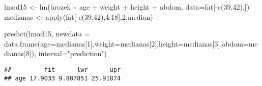 \documentclass[
]{article}
\newenvironment{Shaded}{\begin{snugshade}}{\end{snugshade}}
\newcommand{\AttributeTok}[1]{\textcolor[rgb]{0.77,0.63,0.00}{#1}}
\newcommand{\DecValTok}[1]{\textcolor[rgb]{0.00,0.00,0.81}{#1}}
\newcommand{\FunctionTok}[1]{\textcolor[rgb]{0.00,0.00,0.00}{#1}}
\newcommand{\NormalTok}[1]{#1}
\newcommand{\OtherTok}[1]{\textcolor[rgb]{0.56,0.35,0.01}{#1}}
\newcommand{\SpecialCharTok}[1]{\textcolor[rgb]{0.00,0.00,0.00}{#1}}
\newcommand{\StringTok}[1]{\textcolor[rgb]{0.31,0.60,0.02}{#1}}
\begin{document}
\begin{Shaded}
\begin{Highlighting}[]
\NormalTok{lmod15 }\OtherTok{\textless{}{-}} \FunctionTok{lm}\NormalTok{(brozek }\SpecialCharTok{\textasciitilde{}}\NormalTok{ age }\SpecialCharTok{+}\NormalTok{ weight }\SpecialCharTok{+}\NormalTok{ height }\SpecialCharTok{+}\NormalTok{ abdom, }\AttributeTok{data=}\NormalTok{fat[}\SpecialCharTok{{-}}\FunctionTok{c}\NormalTok{(}\DecValTok{39}\NormalTok{,}\DecValTok{42}\NormalTok{),])}
\NormalTok{medianas }\OtherTok{\textless{}{-}} \FunctionTok{apply}\NormalTok{(fat[}\SpecialCharTok{{-}}\FunctionTok{c}\NormalTok{(}\DecValTok{39}\NormalTok{,}\DecValTok{42}\NormalTok{),}\DecValTok{4}\SpecialCharTok{:}\DecValTok{18}\NormalTok{],}\DecValTok{2}\NormalTok{,median)}

\FunctionTok{predict}\NormalTok{(lmod15, }\AttributeTok{newdata =} \FunctionTok{data.frame}\NormalTok{(}\AttributeTok{age=}\NormalTok{medianas[}\DecValTok{1}\NormalTok{],}\AttributeTok{weight=}\NormalTok{medianas[}\DecValTok{2}\NormalTok{],}\AttributeTok{height=}\NormalTok{medianas[}\DecValTok{3}\NormalTok{],}\AttributeTok{abdom=}\NormalTok{medianas[}\DecValTok{8}\NormalTok{]), }\AttributeTok{interval=}\StringTok{"prediction"}\NormalTok{)}
\end{Highlighting}
\end{Shaded}

\begin{verbatim}
##         fit      lwr      upr
## age 17.9033 9.887851 25.91874
\end{verbatim}
\end{document}
